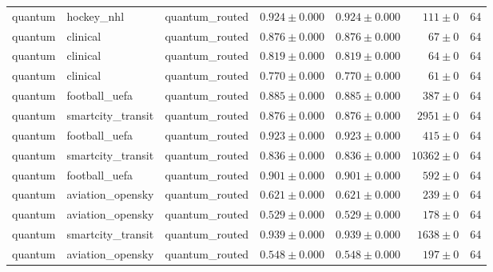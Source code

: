 \begin{table}[htbp]
\begin{tabular}{l l l r r r r}
quantum & hockey\_nhl & quantum\_routed & $0.924\pm0.000$ & $0.924\pm0.000$ & $111\pm0$ & 64 \\
quantum & clinical & quantum\_routed & $0.876\pm0.000$ & $0.876\pm0.000$ & $67\pm0$ & 64 \\
quantum & clinical & quantum\_routed & $0.819\pm0.000$ & $0.819\pm0.000$ & $64\pm0$ & 64 \\
quantum & clinical & quantum\_routed & $0.770\pm0.000$ & $0.770\pm0.000$ & $61\pm0$ & 64 \\
quantum & football\_uefa & quantum\_routed & $0.885\pm0.000$ & $0.885\pm0.000$ & $387\pm0$ & 64 \\
quantum & smartcity\_transit & quantum\_routed & $0.876\pm0.000$ & $0.876\pm0.000$ & $2951\pm0$ & 64 \\
quantum & football\_uefa & quantum\_routed & $0.923\pm0.000$ & $0.923\pm0.000$ & $415\pm0$ & 64 \\
quantum & smartcity\_transit & quantum\_routed & $0.836\pm0.000$ & $0.836\pm0.000$ & $10362\pm0$ & 64 \\
quantum & football\_uefa & quantum\_routed & $0.901\pm0.000$ & $0.901\pm0.000$ & $592\pm0$ & 64 \\
quantum & aviation\_opensky & quantum\_routed & $0.621\pm0.000$ & $0.621\pm0.000$ & $239\pm0$ & 64 \\
quantum & aviation\_opensky & quantum\_routed & $0.529\pm0.000$ & $0.529\pm0.000$ & $178\pm0$ & 64 \\
quantum & smartcity\_transit & quantum\_routed & $0.939\pm0.000$ & $0.939\pm0.000$ & $1638\pm0$ & 64 \\
quantum & aviation\_opensky & quantum\_routed & $0.548\pm0.000$ & $0.548\pm0.000$ & $197\pm0$ & 64 \\
\hline
\end{tabular}
\end{table}
